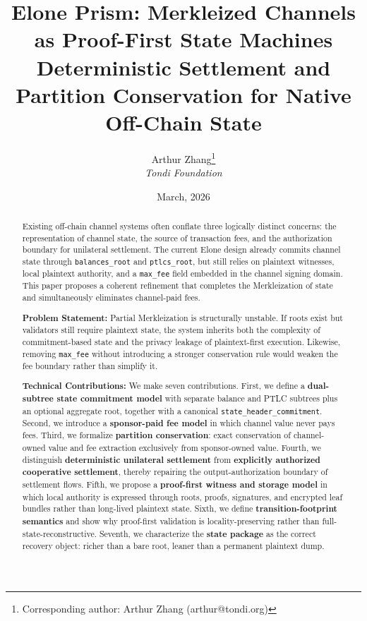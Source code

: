 \documentclass[11pt,a4paper]{article}
\title{Elone Prism: Merkleized Channels as Proof-First State Machines\\
\large Deterministic Settlement and Partition Conservation for Native Off-Chain State}
\author{
    Arthur Zhang\thanks{Corresponding author: Arthur Zhang (arthur@tondi.org)} \\
    \textit{Tondi Foundation}
}
\date{March, 2026}
\newcommand{\code}[1]{\texttt{#1}}
\begin{document}
\maketitle

\begin{abstract}
Existing off-chain channel systems often conflate three logically distinct concerns: the representation of channel state, the source of transaction fees, and the authorization boundary for unilateral settlement. The current Elone design already commits channel state through \code{balances\_root} and \code{ptlcs\_root}, but still relies on plaintext witnesses, local plaintext authority, and a \code{max\_fee} field embedded in the channel signing domain. This paper proposes a coherent refinement that completes the Merkleization of state and simultaneously eliminates channel-paid fees.

\textbf{Problem Statement:} Partial Merkleization is structurally unstable. If roots exist but validators still require plaintext state, the system inherits both the complexity of commitment-based state and the privacy leakage of plaintext-first execution. Likewise, removing \code{max\_fee} without introducing a stronger conservation rule would weaken the fee boundary rather than simplify it.

\textbf{Technical Contributions:} We make seven contributions. First, we define a \textbf{dual-subtree state commitment model} with separate balance and PTLC subtrees plus an optional aggregate root, together with a canonical \code{state\_header\_commitment}. Second, we introduce a \textbf{sponsor-paid fee model} in which channel value never pays fees. Third, we formalize \textbf{partition conservation}: exact conservation of channel-owned value and fee extraction exclusively from sponsor-owned value. Fourth, we distinguish \textbf{deterministic unilateral settlement} from \textbf{explicitly authorized cooperative settlement}, thereby repairing the output-authorization boundary of settlement flows. Fifth, we propose a \textbf{proof-first witness and storage model} in which local authority is expressed through roots, proofs, signatures, and encrypted leaf bundles rather than long-lived plaintext state. Sixth, we define \textbf{transition-footprint semantics} and show why proof-first validation is locality-preserving rather than full-state-reconstructive. Seventh, we characterize the \textbf{state package} as the correct recovery object: richer than a bare root, leaner than a permanent plaintext dump.


\end{abstract}
\end{document}
